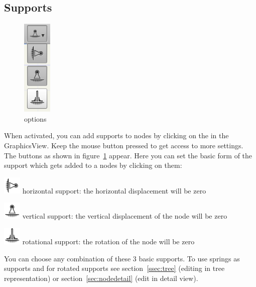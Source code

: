 \documentclass[a4paper,11pt]{report}
\begin{document}
\subsection{Supports}
\begin{minipage}[h]{4cm}
\begin{figure}[H]
\begin{center}
\includegraphics[scale=0.6]{../pictures/support_opt.png}
\caption{options}
\label{pic:support_opt}
\end{center}
\end{figure}
\end{minipage}
\begin{minipage}[h]{\textwidth-4cm}
When activated, you can add supports to nodes by clicking on the in the GraphicsView. Keep the mouse button pressed to get access to more settings. The buttons as shown in figure~\ref{pic:support_opt} appear. Here you can set the basic form of the support which gets added to a nodes by clicking on them:
\begin{trivlist}
	\item[] \includegraphics[scale = 0.5]{../../icons/bearingH.png} horizontal support: the horizontal displacement will be zero
	\item[] \includegraphics[scale = 0.5]{../../icons/bearing.png} vertical support: the vertical displacement of the node will be zero
	\item[] \includegraphics[scale = 0.5]{../../icons/bearingM.png} rotational support: the rotation of the node will be zero
\end{trivlist}
You can choose any combination of these 3 basic supports. To use springs as supports and for rotated supports see section~\ref{ssec:tree} (editing in tree representation) or section~\ref{sec:nodedetail} (edit in detail view).
\end{minipage}
\end{document}
